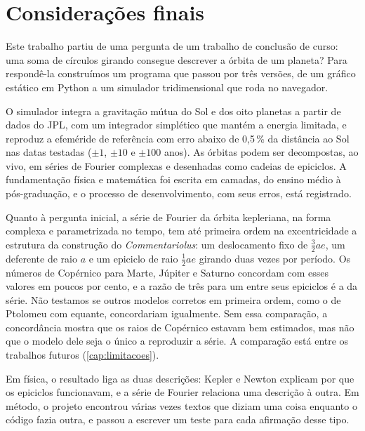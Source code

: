 \chapter{Considerações finais}\label{cap:conclusao}

Este trabalho partiu de uma pergunta de um trabalho de conclusão de curso: uma soma de círculos girando consegue descrever a órbita de um planeta? Para respondê-la construímos um programa que passou por três versões, de um gráfico estático em Python a um simulador tridimensional que roda no navegador.

O simulador integra a gravitação mútua do Sol e dos oito planetas a partir de dados do JPL, com um integrador simplético que mantém a energia limitada, e reproduz a efeméride de referência com erro abaixo de 0,5\,\% da distância ao Sol nas datas testadas ($\pm 1$, $\pm 10$ e $\pm 100$ anos). As órbitas podem ser decompostas, ao vivo, em séries de Fourier complexas e desenhadas como cadeias de epiciclos. A fundamentação física e matemática foi escrita em camadas, do ensino médio à pós-graduação, e o processo de desenvolvimento, com seus erros, está registrado.

Quanto à pergunta inicial, a série de Fourier da órbita kepleriana, na forma complexa e parametrizada no tempo, tem até primeira ordem na excentricidade a estrutura da construção do \emph{Commentariolus}: um deslocamento fixo de $\frac32 ae$, um deferente de raio $a$ e um epiciclo de raio $\frac12 ae$ girando duas vezes por período. Os números de Copérnico para Marte, Júpiter e Saturno concordam com esses valores em poucos por cento, e a razão de três para um entre seus epiciclos é a da série. Não testamos se outros modelos corretos em primeira ordem, como o de Ptolomeu com equante, concordariam igualmente. Sem essa comparação, a concordância mostra que os raios de Copérnico estavam bem estimados, mas não que o modelo dele seja o único a reproduzir a série. A comparação está entre os trabalhos futuros (\autoref{cap:limitacoes}).

Em física, o resultado liga as duas descrições: Kepler e Newton explicam por que os epiciclos funcionavam, e a série de Fourier relaciona uma descrição à outra. Em método, o projeto encontrou várias vezes textos que diziam uma coisa enquanto o código fazia outra, e passou a escrever um teste para cada afirmação desse tipo.
